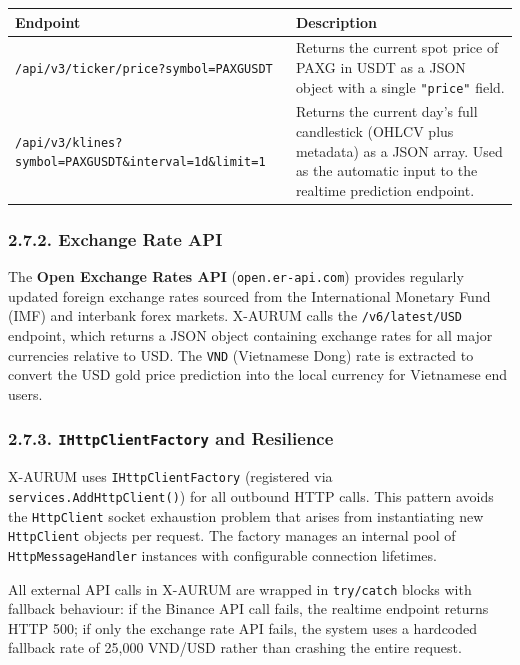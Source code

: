 \begin{center}
\begin{tabular}{|p{5.5cm}|p{8cm}|}
\hline
\textbf{Endpoint} & \textbf{Description}\\
\hline
\texttt{/api/v3/ticker/price}\newline\texttt{?symbol=PAXGUSDT} & Returns the current spot price of PAXG in USDT as a JSON object with a single \texttt{"price"} field.\\
\hline
\texttt{/api/v3/klines}\newline\texttt{?symbol=PAXGUSDT}\newline\texttt{\&interval=1d\&limit=1} & Returns the current day's full candlestick (OHLCV plus metadata) as a JSON array. Used as the automatic input to the realtime prediction endpoint.\\
\hline
\end{tabular}
\end{center}


\subsubsection{2.7.2. Exchange Rate API}
The \textbf{Open Exchange Rates API} (\texttt{open.er-api.com}) provides regularly updated foreign exchange rates sourced from the International Monetary Fund (IMF) and interbank forex markets. X-AURUM calls the \texttt{/v6/latest/USD} endpoint, which returns a JSON object containing exchange rates for all major currencies relative to USD. The \texttt{VND} (Vietnamese Dong) rate is extracted to convert the USD gold price prediction into the local currency for Vietnamese end users.

\subsubsection{2.7.3. \texttt{IHttpClientFactory} and Resilience}
X-AURUM uses \texttt{IHttpClientFactory} (registered via \texttt{services.AddHttpClient()}) for all outbound HTTP calls. This pattern avoids the \texttt{HttpClient} socket exhaustion problem that arises from instantiating new \texttt{HttpClient} objects per request. The factory manages an internal pool of \texttt{HttpMessageHandler} instances with configurable connection lifetimes.

All external API calls in X-AURUM are wrapped in \texttt{try/catch} blocks with fallback behaviour: if the Binance API call fails, the realtime endpoint returns HTTP 500; if only the exchange rate API fails, the system uses a hardcoded fallback rate of 25,000 VND/USD rather than crashing the entire request.

